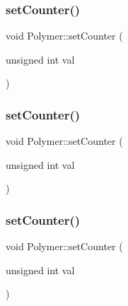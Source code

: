 \subsubsection{\texorpdfstring{set\+Counter()}{setCounter()}\hspace{0.1cm}{\footnotesize\ttfamily [6/10]}}
{\footnotesize\ttfamily void Polymer\+::set\+Counter (\begin{DoxyParamCaption}\item[{unsigned int}]{val }\end{DoxyParamCaption})\hspace{0.3cm}{\ttfamily [inline]}}

\mbox{\label{classPolymer_a7ed6bbe09a570b59f9253d63fd3326d2}} 
\subsubsection{\texorpdfstring{set\+Counter()}{setCounter()}\hspace{0.1cm}{\footnotesize\ttfamily [7/10]}}
{\footnotesize\ttfamily void Polymer\+::set\+Counter (\begin{DoxyParamCaption}\item[{unsigned int}]{val }\end{DoxyParamCaption})\hspace{0.3cm}{\ttfamily [inline]}}

\mbox{\label{classPolymer_a7ed6bbe09a570b59f9253d63fd3326d2}} 
\subsubsection{\texorpdfstring{set\+Counter()}{setCounter()}\hspace{0.1cm}{\footnotesize\ttfamily [8/10]}}
{\footnotesize\ttfamily void Polymer\+::set\+Counter (\begin{DoxyParamCaption}\item[{unsigned int}]{val }\end{DoxyParamCaption})\hspace{0.3cm}{\ttfamily [inline]}}

\mbox{\label{classPolymer_a7ed6bbe09a570b59f9253d63fd3326d2}} 
